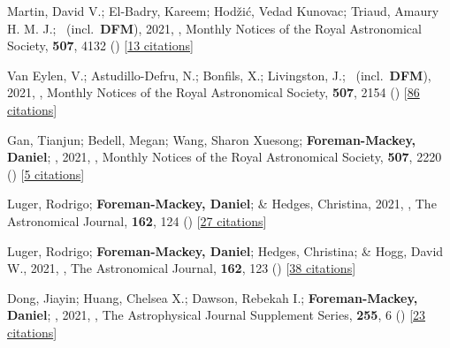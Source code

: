 \item[{\color{numcolor}\scriptsize74}] Martin, David V.; El-Badry, Kareem; Hod{\v{z}}i{\'c}, Vedad Kunovac; Triaud, Amaury H. M. J.; \etal\ (incl.\ \textbf{DFM}), 2021, , Monthly Notices of the Royal Astronomical Society, \textbf{507}, 4132 () [\href{https://ui.adsabs.harvard.edu/abs/2021MNRAS.507.4132M}{13 citations}]

\item[{\color{numcolor}\scriptsize73}] Van Eylen, V.; Astudillo-Defru, N.; Bonfils, X.; Livingston, J.; \etal\ (incl.\ \textbf{DFM}), 2021, , Monthly Notices of the Royal Astronomical Society, \textbf{507}, 2154 () [\href{https://ui.adsabs.harvard.edu/abs/2021MNRAS.507.2154V}{86 citations}]

\item[{\color{numcolor}\scriptsize72}] Gan, Tianjun; Bedell, Megan; Wang, Sharon Xuesong; \textbf{Foreman-Mackey, Daniel}; \etal, 2021, , Monthly Notices of the Royal Astronomical Society, \textbf{507}, 2220 () [\href{https://ui.adsabs.harvard.edu/abs/2021MNRAS.507.2220G}{5 citations}]

\item[{\color{numcolor}\scriptsize71}] Luger, Rodrigo; \textbf{Foreman-Mackey, Daniel}; \& Hedges, Christina, 2021, , The Astronomical Journal, \textbf{162}, 124 () [\href{https://ui.adsabs.harvard.edu/abs/2021AJ....162..124L}{27 citations}]

\item[{\color{numcolor}\scriptsize70}] Luger, Rodrigo; \textbf{Foreman-Mackey, Daniel}; Hedges, Christina; \& Hogg, David W., 2021, , The Astronomical Journal, \textbf{162}, 123 () [\href{https://ui.adsabs.harvard.edu/abs/2021AJ....162..123L}{38 citations}]

\item[{\color{numcolor}\scriptsize69}] Dong, Jiayin; Huang, Chelsea X.; Dawson, Rebekah I.; \textbf{Foreman-Mackey, Daniel}; \etal, 2021, , The Astrophysical Journal Supplement Series, \textbf{255}, 6 () [\href{https://ui.adsabs.harvard.edu/abs/2021ApJS..255....6D}{23 citations}]

